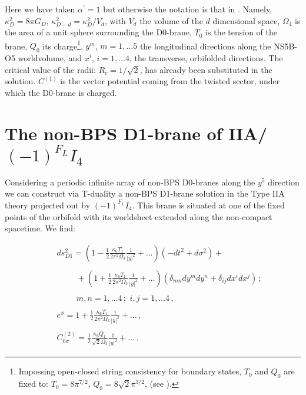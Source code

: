 \documentclass[12pt,a4paper]{article}
\begin{document}
\noindent Here we have taken $\alpha^\prime=1$ but otherwise the
notation is that in \cite{EP}. Namely, $\kappa^2_{D}=8\pi G_D$,
$\kappa^2_{D-d}=\kappa^2_{D}/V_d$, with $V_d$ the volume of the
$d$ dimensional space,
$\Omega_4$ is the area of a unit sphere surrounding the D0-brane, 
$T_0$ is the tension of the brane, $Q_0$ its 
charge\footnote{Impossing open-closed string consistency for 
boundary states, $T_0$ and $Q_0$ are fixed to: $T_0=8\pi^{7/2}$, 
$Q_0=8\sqrt{2}\pi^{3/2}$, (see \cite{EP}).}, 
$y^m$, $m=1,\dots 5$ the longitudinal directions along the NS5B-O5
worldvolume, and
$x^i$, $i=1,\dots 4$, the transverse, orbifolded directions. 
The critical value of the
radii: $R_c=1/\sqrt{2}$, has already been substituted in the solution.
$C^{(1)}$ is the vector potential coming from the twisted sector,
under which the D0-brane is charged.





\section{The non-BPS D1-brane of IIA/$(-1)^{F_L}I_4$}

Considering a periodic infinite array of non-BPS D0-branes
along the $y^5$ direction we can construct via T-duality 
a non-BPS D1-brane solution in the Type IIA theory
projected out by $(-1)^{F_L}I_4$. 
This brane is situated at one of the fixed points of the orbifold
with its worldsheet extended along the non-compact spacetime.
We find:

\begin{eqnarray}
\label{D1}
&&ds_{D1}^2=(1-\frac12\frac{\kappa_6 T_1}{2\pi^2 \Omega_3}
\frac{1}{|y|^2}+\dots)(-dt^2+d\sigma^2)+\nonumber\\
&&\nonumber\\
&&\hspace{1cm}+(1+\frac12\frac{\kappa_6 T_1}
{2\pi^2\Omega_3}\frac{1}{|y|^2}+\dots)\left(\delta_{mn}dy^m dy^n
+\delta_{ij}dx^i dx^j\right) \, ; \nonumber\\
&&\nonumber\\
&&\hspace{1cm}m,n=1,\dots 4\, ; \,\, i,j=1,\dots 4\, ,\nonumber\\
& &\nonumber\\
&& e^\phi = 1+\frac12\frac{\kappa_6 T_1}{2\pi^2\Omega_3}\frac{1}{|y|^2}
+\dots \, ,\nonumber\\
& &\nonumber\\
&& C^{(2)}_{0\sigma}=\frac12 \frac{\kappa_6 Q_1}{\sqrt{2}\Omega_3}
\frac{1}{|y|^2}+\dots \, .
\end{eqnarray}
\end{document}
